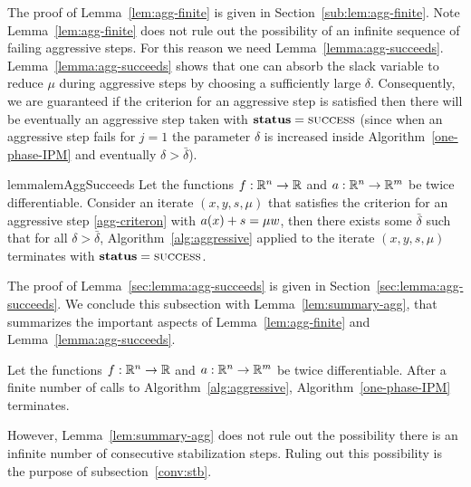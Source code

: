 \documentclass{article}
\begin{document}
The proof of Lemma~\ref{lem:agg-finite} is given in Section~\ref{sub:lem:agg-finite}. Note Lemma~\ref{lem:agg-finite} does not rule out the possibility of an infinite sequence of failing aggressive steps. For this reason we need Lemma~\ref{lemma:agg-succeeds}. Lemma~\ref{lemma:agg-succeeds} shows that one can absorb the slack variable to reduce $\mu$ during aggressive steps by choosing a sufficiently large $\delta$. Consequently, we are guaranteed if the criterion for an aggressive step is satisfied then there will be eventually an aggressive step taken with $\textbf{status} = \textsc{success}$ (since when an aggressive step fails for $j=1$ the parameter $\delta$ is increased inside Algorithm~\ref{one-phase-IPM} and eventually $\delta > \bar{\delta}$).

\begin{restatable}{lemma}{lemAggSucceeds}\label{lemma:agg-succeeds}
Let the functions $f : \mathbb{R}^{n} \rightarrow \mathbb{R}$ and $a : \mathbb{R}^{n} \rightarrow \mathbb{R}^{m}$ be twice differentiable. Consider an iterate $(x, y, s, \mu)$ that satisfies the criterion for an aggressive step \eqref{agg-criteron} with $a(x) + s = \mu w$, then there exists some $\bar{\delta}$ such that for all $\delta > \bar{\delta}$, Algorithm~\ref{alg:aggressive} applied to the iterate $(x, y, s, \mu)$ terminates with $\textbf{status} = \textsc{success}$.
\end{restatable}

The proof of Lemma~\ref{sec:lemma:agg-succeeds} is given in Section~\ref{sec:lemma:agg-succeeds}. We conclude this subsection with Lemma~\ref{lem:summary-agg}, that summarizes the important aspects of Lemma~\ref{lem:agg-finite} and Lemma~\ref{lemma:agg-succeeds}.

\begin{lemma}\label{lem:summary-agg}
Let the functions $f : \mathbb{R}^{n} \rightarrow \mathbb{R}$ and $a : \mathbb{R}^{n} \rightarrow \mathbb{R}^{m}$ be twice differentiable.
After a finite number of calls to Algorithm~\ref{alg:aggressive}, Algorithm~\ref{one-phase-IPM} terminates.
\end{lemma}

However, Lemma~\ref{lem:summary-agg} does not rule out the possibility there is an infinite number of consecutive stabilization steps. Ruling out this possibility is the purpose of subsection~\ref{conv:stb}.
\end{document}
